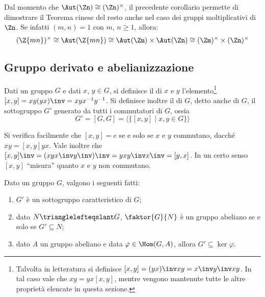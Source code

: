 \documentclass[11pt]{scrartcl}
\begin{document}
	\begin{remark}
		Dal momento che $\Aut(\Zn) \cong (\Zn)^\times$, il precedente
		corollario permette di dimostrare il Teorema cinese del resto anche
		nel caso dei gruppi moltiplicativi di $\Zn$. Se infatti $(m, n) = 1$
		con $m$, $n \geq 1$, allora:
		\[ (\Z{mn})^\times \cong \Aut(\Z{mn}) \cong \Aut(\Zm) \times \Aut(\Zn) \cong (\Zm)^\times \times (\Zn)^\times \]
	\end{remark}
	
	\newpage
	
	\subsection{Gruppo derivato e abelianizzazione}
	
	\begin{definition}
		Dati un gruppo $G$ e dati $x$, $y \in G$, si definisce il 
		di $x$ e $y$ l'elemento\footnote{
			Talvolta in letteratura si definisce $[x, y] = (yx)\inv xy = x\inv y\inv x y$. In
			tal caso vale che $xy = yx[x, y]$, mentre vengono mantenute tutte le
			altre proprietà elencate in questa sezione.
		} $[x, y] = xy(yx)\inv = xyx^{-1}y^{-1}$. Si definisce inoltre
		il  di $G$, detto anche  di $G$,
		il sottogruppo $G'$ generato da tutti i commutatori di $G$, ossia
		\[
		G' = [G, G] = \langle\{[x, y]\mid x, y \in G\}\rangle
		\]
	\end{definition}
	
	\begin{remark}
		Si verifica facilmente che $[x, y] = e$ se e solo se $x$ e $y$ commutano, dacché
		$xy = [x, y]yx$. Vale inoltre che $[x, y]\inv = (xyx\inv y\inv)\inv = yxy\inv x\inv =
		[y, x]$. In un certo senso $[x, y]$ ``misura'' quanto $x$ e $y$ non commutano.
	\end{remark}
	
	\begin{proposition}
		\label{prop1.35}
		Dato un gruppo $G$, valgono i seguenti fatti:
		\begin{enumerate}[(1)]
			\item $G'$ è un sottogruppo caratteristico di $G$;
			\item dato $N \trianglelefteqslant G$, $\faktor{G}{N}$ è un gruppo abeliano se
			e solo se $G' \subseteq N$;
			\item dato $A$ un gruppo abeliano e data $\varphi \in \Hom(G, A)$,
			allora $G' \subseteq \ker\varphi$.
		\end{enumerate}
	\end{proposition}
	
\end{document}
